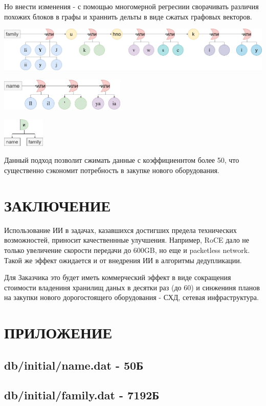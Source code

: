 \documentclass[12pt,a4paper]{article}
\begin{document}
Но внести изменения - с помощью многомерной регресиии сворачивать различия похожих блоков в графы и храннить дельты в виде сжатых графовых векторов.

\includegraphics[width=1\textwidth]{graph-family}

\includegraphics[width=0.45\textwidth]{graph-name}

\includegraphics[width=0.15\textwidth]{graph-denormalized}

Данный подход позволит сжимать данные с коэффициеннтом более 50, что существенно сэкономит потребность в закупке нового оборудования.

\section{ЗАКЛЮЧЕНИЕ}
Использование ИИ в задачах, казавшихся достигших предела технических возможностей, приносит качественнные улучшения. Например, RoCE дало не только увеличение скорости передачи до 600GB, но еще и packetless network. Такой же эффект ожидается и от внедрения ИИ в алгоритмы дедупликации.

Для Заказчика это будет иметь коммерческий эффект в виде сокращения стоимости владениня хранилищ даных в десятки раз (до 60) и синжениня планов на закупки нового дорогостоящего оборудования - СХД, сетевая инфраструктура.

\section{ПРИЛОЖЕНИЕ}
\subsection{db/initial/name.dat - 50Б}


\subsection{db/initial/family.dat - 7192Б}

\end{document}
